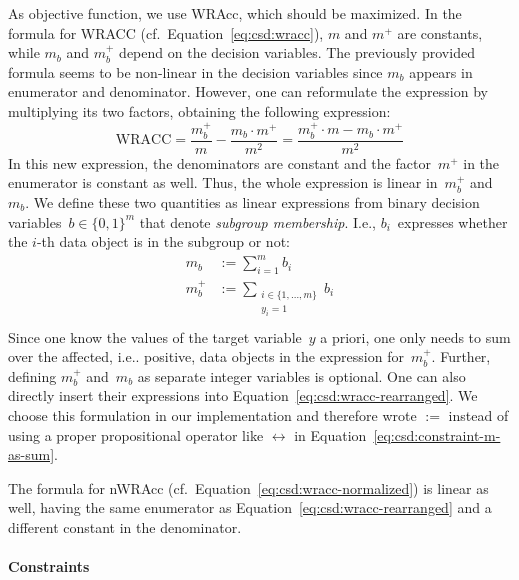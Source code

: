 \documentclass{article}
\theoremstyle{definition}
\begin{document}
As objective function, we use WRAcc, which should be maximized.
In the formula for WRACC (cf.~Equation~\ref{eq:csd:wracc}), $m$ and $m^+$ are constants, while $m_b$ and $m_b^+$ depend on the decision variables.
The previously provided formula seems to be non-linear in the decision variables since $m_b$ appears in enumerator and denominator.
However, one can reformulate the expression by multiplying its two factors, obtaining the following expression:
%
\begin{equation}
	\text{WRACC} = \frac{m_b^+}{m} - \frac{m_b \cdot m^+}{m^2} = \frac{m_b^+ \cdot m - m_b \cdot m^+}{m^2}
	\label{eq:csd:wracc-rearranged}
\end{equation}
%
In this new expression, the denominators are constant and the factor~$m^+$ in the enumerator is constant as well.
Thus, the whole expression is linear in~$m_b^+$ and~$m_b$.
We define these two quantities as linear expressions from binary decision variables~$b \in \{0, 1\}^m$ that denote \emph{subgroup membership}.
I.e., $b_i$~expresses whether the $i$-th data object is in the subgroup or not:
%
\begin{equation}
	\begin{aligned}
		 m_b &:= \sum_{i=1}^{m} b_i \\
		 m_b^+ &:= \sum_{\substack{i \in \{1, \dots, m\} \\ y_i = 1 }} b_i \\
	\end{aligned}
	\label{eq:csd:constraint-m-as-sum}
\end{equation}
%
Since one know the values of the target variable~$y$ a priori, one only needs to sum over the affected, i.e.. positive, data objects in the expression for~$m_b^+$.
Further, defining $m_b^+$ and~$m_b$ as separate integer variables is optional.
One can also directly insert their expressions into Equation~\ref{eq:csd:wracc-rearranged}.
We choose this formulation in our implementation and therefore wrote $:=$ instead of using a proper propositional operator like $\leftrightarrow$ in Equation~\ref{eq:csd:constraint-m-as-sum}.

The formula for nWRAcc (cf.~Equation~\ref{eq:csd:wracc-normalized}) is linear as well, having the same enumerator as Equation~\ref{eq:csd:wracc-rearranged} and a different constant in the denominator.

\paragraph{Constraints}
\end{document}
